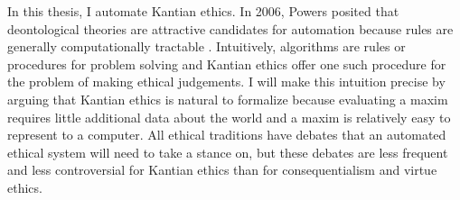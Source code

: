 %
\begin{isabellebody}%
%
%
\isadelimtheory
%
\endisadelimtheory
%
\isatagtheory
%
\endisatagtheory
{\isafoldtheory}%
%
\isadelimtheory
%
\endisadelimtheory
%
\isadelimdocument
%
\endisadelimdocument
%
\isatagdocument
%
\isamarkuptrue%
%
\endisatagdocument
{\isafolddocument}%
%
\isadelimdocument
%
\endisadelimdocument
%
\begin{isamarkuptext}%
In this thesis, I automate Kantian ethics. In 2006, Powers posited that deontological theories are 
attractive candidates for automation because rules are generally computationally tractable \cite[1]{powers}. 
Intuitively, algorithms are rules or procedures for problem solving and Kantian ethics offer one such 
procedure for the problem of making ethical judgements. I will make this intuition precise by
arguing that Kantian ethics is natural to formalize because evaluating a maxim requires little additional
data about the world and a maxim is relatively easy to represent to a computer. All 
ethical traditions have debates that an automated ethical system will need to take a stance on, but these debates
are less frequent and less controversial for Kantian ethics than for consequentialism and 
virtue ethics. 


\end{isamarkuptext}
\end{isabellebody}
